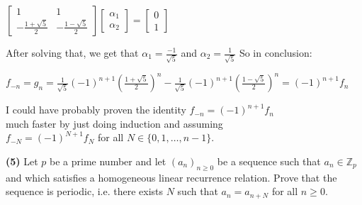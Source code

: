 \documentclass{book}
\newcommand{\exPP}{%
   \color{RedViolet}%
   \fontsize{12}{14}\selectfont%
}
\newenvironment{myIndent}{%
   \begin{adjustwidth}{2.5em}{0em}%
}{%
   \end{adjustwidth}%
}
\newenvironment{myTindent}{%
   \begin{adjustwidth}{7.5em}{0em}%
}{%
   \end{adjustwidth}%
}
\newcommand{\blab}[1]{\textbf{#1}}
\newcommand{\retTwo}{\hfill\bigbreak}
\begin{document}
\begin{enumerate}
\begin{myIndent}
      {\centering $\begin{bmatrix}
         1 & 1 \\ -\frac{1+\sqrt{5}}{2} & -\frac{1-\sqrt{5}}{2}
      \end{bmatrix}
      \begin{bmatrix}
         \alpha_1 \\ \alpha_2
      \end{bmatrix} = 
      \begin{bmatrix}
         0 \\ 1
      \end{bmatrix}$\newpage\par}

      After solving that, we get that $\alpha_1 = \frac{-1}{\sqrt{5}}$ and $\alpha_2 = \frac{1}{\sqrt{5}}$ So in conclusion:

      {\centering $f_{-n} = g_n = \frac{1}{\sqrt{5}}(-1)^{n+1}\left(\frac{1+\sqrt{5}}{2}\right)^n - \frac{1}{\sqrt{5}}(-1)^{n+1}\left(\frac{1-\sqrt{5}}{2}\right)^n = (-1)^{n+1} f_n$ \retTwo\par}

      
      \begin{myTindent}\exPP\color{VioletRed}
         I could have probably proven the identity $f_{-n} = (-1)^{n+1} f_n$\\ much faster by just doing induction and assuming\\ $f_{-N} = (-1)^{N+1} f_N$ for all $N \in \{0, 1, \ldots, n-1\}$.\retTwo
      \end{myTindent}
   \end{myIndent}
\end{enumerate}

\blab{(5)} Let $p$ be a prime number and let $(a_n)_{n \geq 0}$ be a sequence such that $a_n \in \mathbb{Z}_p$ and which satisfies a homogeneous linear recurrence relation. Prove that the sequence is periodic, i.e. there exists $N$ such that $a_n = a_{n + N}$ for all $n \geq 0$.\\ [-10pt]
\end{document}
